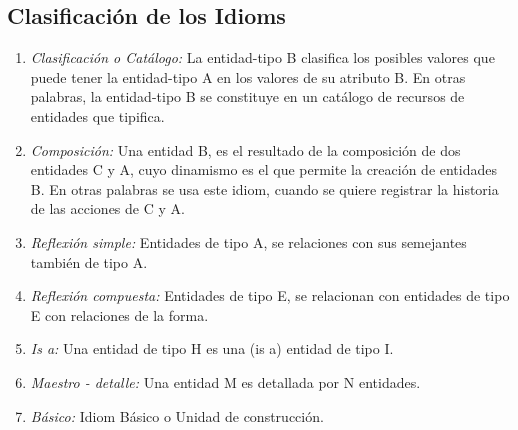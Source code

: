 \subsection{Clasificación de los Idioms}
\begin{enumerate}
    \item \textit {Clasificación o Catálogo:} La entidad-tipo B clasifica los posibles valores
    que puede tener la entidad-tipo A en los valores de su atributo
    B. En otras palabras, la entidad-tipo B se constituye en un
    catálogo de recursos de entidades que tipifica.
    \item \textit {Composición:} Una entidad B, es el resultado de la composición
    de dos entidades C y A, cuyo dinamismo es el que permite la
    creación de entidades B. En otras palabras se usa este idiom,
    cuando se quiere registrar la historia de las acciones de C y A.
    \item \textit {Reflexión simple:} Entidades de tipo A, se relaciones con sus
    semejantes también de tipo A.
    \item \textit {Reflexión compuesta:} Entidades de tipo E, se relacionan con
    entidades de tipo E con relaciones de la forma.
    \item \textit {Is a:} Una entidad de tipo H es una (is a) entidad
    de tipo I.
    \item \textit {Maestro - detalle:} Una entidad M es detallada por N entidades.
    \item \textit {Básico:} Idiom Básico o Unidad de construcción.
\end{enumerate}
